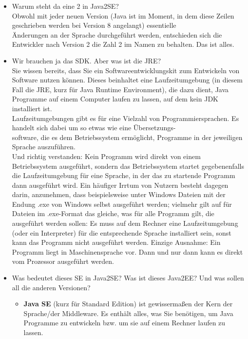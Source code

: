 \begin{itemize}
	\item Warum steht da eine 2 in Java2SE?\\
	Obwohl mit jeder neuen Version (Java ist im Moment, in dem diese Zeilen geschrieben werden bei Version 8 angelangt) essentielle\\ Änderungen an der Sprache durchgeführt werden, entschieden sich die Entwickler nach Version 2 die Zahl 2 im Namen zu behalten. Das ist alles.
	\item Wir brauchen ja das SDK. Aber was ist die JRE?\\
	Sie wissen bereits, dass Sie ein Softwareentwicklungskit zum Entwickeln von Software nutzen können. Dieses beinhaltet eine Laufzeitumgebung (in diesem Fall die JRE, kurz für Java Runtime Environment), die dazu dient, Java Programme auf einem Computer laufen zu lassen, auf dem kein JDK installiert ist.\\
	Laufzeitumgebungen gibt es für eine Vielzahl von Programmiersprachen. Es handelt sich dabei um so etwas wie eine Übersetzungs-\\software, die es dem Betriebssystem ermöglicht, Programme in der jeweiligen Sprache auszuführen.\\
	Und richtig verstanden: Kein Programm wird direkt von einem Betriebssystem ausgeführt, sondern das Betriebssystem startet gegebenenfalls die Laufzeitumgebung für eine Sprache, in der das zu startende Programm dann ausgeführt wird. Ein häufiger Irrtum von Nutzern besteht dagegen darin, anzunehmen, dass beispielsweise unter Windows Dateien mit der Endung .exe von Windows selbst ausgeführt werden; vielmehr gilt auf für Dateien im .exe-Format das gleiche, was für alle Programm gilt, die ausgeführt werden sollen: Es muss auf dem Rechner eine Laufzeitumgebung (oder ein Interpreter) für die entsprechende Sprache installiert sein, sonst kann das Programm nicht ausgeführt werden. Einzige Ausnahme: Ein Programm liegt in Maschinensprache vor. Dann und nur dann kann es direkt vom Prozessor ausgeführt werden.\\
	\item Was bedeutet dieses SE in Java2SE? Was ist dieses Java2EE? Und was sollen all die anderen Versionen?
	\begin{itemize}
		\item \textbf{Java SE} (kurz für Standard Edition) ist gewissermaßen der Kern der Sprache/der Middleware. Es enthält alles, was Sie benötigen, um Java Programme zu entwickeln bzw. um sie auf einem Rechner laufen zu lassen.

\end{itemize}
\end{itemize}
